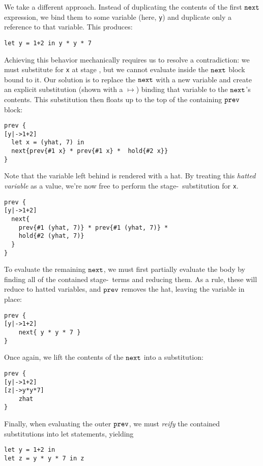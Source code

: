 We take a different approach.  
Instead of duplicating the contents of the first ${\tt next}$ expression, we bind them to some variable (here, {\tt y}) and
duplicate only a reference to that variable.  This produces:
\begin{lstlisting} 
let y = 1+2 in y * y * 7
\end{lstlisting}


Achieving this behavior mechanically requires us to resolve a contradiction:
we must substitute for \texttt{x} at stage \bbone, but we cannot evaluate inside the ${\tt next}$ block bound to it. 
Our solution is to replace the ${\tt next}$ with a new variable and create an explicit substitution (shown with a $\mapsto$) binding that variable to the ${\tt next}$'s contents.  
This substitution then floats up to the top of the containing ${\tt prev}$ block:
\begin{lstlisting} 
prev {
[y|->1+2]
  let x = (yhat, 7) in
  next{prev{#1 x} * prev{#1 x} *  hold{#2 x}}
}
\end{lstlisting}
Note that the variable left behind is rendered with a hat.  By treating this {\em hatted variable} as a value, we're now free to perform the stage-\bbone~substitution for {\tt x}.  
\begin{lstlisting} 
prev {
[y|->1+2]
  next{
    prev{#1 (yhat, 7)} * prev{#1 (yhat, 7)} *
    hold{#2 (yhat, 7)}
  }
}
\end{lstlisting}
To evaluate the remaining ${\tt next}$, we must first partially evaluate the body by finding all of the contained stage-\bbone~terms and reducing them. 
As a rule, these will reduce to hatted variables, and ${\tt prev}$ removes the hat, leaving the variable in place:
\begin{lstlisting} 
prev {
[y|->1+2]
    next{ y * y * 7 }
}
\end{lstlisting}
Once again, we lift the contents of the ${\tt next}$ into a substitution:
\begin{lstlisting} 
prev {
[y|->1+2]
[z|->y*y*7]
    zhat
}
\end{lstlisting}
Finally, when evaluating the outer ${\tt prev}$, we must {\em reify} the contained substitutions into let statements, yielding
\begin{lstlisting} 
let y = 1+2 in
let z = y * y * 7 in z
\end{lstlisting}

